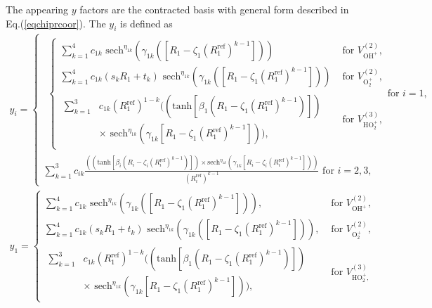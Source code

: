 \documentclass[12pt]{article}
\def\D{\displaystyle}
\begin{document}
The appearing $y$ factors are the contracted basis with general form described in Eq.(\ref{eqchiprcoor}). The $y_i$ is defined as
\begin{equation}
    \begin{split}
        y_i =
        \begin{cases}
            \begin{split}
                \begin{cases}
                    \D\sum_{k=1}^4 c_{1k}\text{ sech}^{\eta_{1k}}(\gamma_{1k}(\left[R_1 - \zeta_1(R_1^{\text{ref}})^{k-1}\right])) &\text{ for } V^{(2)}_{\text{OH}^+},\\
                    \D\sum_{k=1}^4 c_{1k}(s_kR_1 + t_k)\text{ sech}^{\eta_{1k}}(\gamma_{1k}(\left[R_1 - \zeta_1(R_1^{\text{ref}})^{k-1}\right])) &\text{ for } V^{(2)}_{\text{O}_2^+}, \\
                    \begin{split}
                        \D\sum_{k=1}^3 &c_{1k}(R_1^{\text{ref}})^{1-k}((\text{tanh}\left[\beta_1(R_1 - \zeta_1(R_1^\text{ref})^{k-1})\right]) \\ &\times \text{ sech}^{\eta_{1k}}(\gamma_{1k}\left[R_1 - \zeta_1(R_1^{\text{ref}})^{k-1}\right])), 
                    \end{split}
                    &\text{ for } V^{(3)}_{\text{HO}_2^+},
                \end{cases}
                \text{for }i=1,
            \end{split} \\
            \D\sum_{k=1}^3 c_{ik}\frac{((\text{tanh}\left[\beta_i(R_i - \zeta_i(R_i^\text{ref})^{k-1})\right]) \times \text{sech}^{\eta_{1k}}(\gamma_{1k}\left[R_i - \zeta_i(R_i^{\text{ref}})^{k-1}\right]))}{(R_i^{\text{ref}})^{k-1}} \text{ for }i=2,3,
        \end{cases}
    \end{split}
\end{equation}
\iffalse %
\begin{equation}
    \begin{split}
        y_1 = 
        \begin{cases}
            \D\sum_{k=1}^4 c_{1k}\text{ sech}^{\eta_{1k}}(\gamma_{1k}(\left[R_1 - \zeta_1(R_1^{\text{ref}})^{k-1}\right])), &\text{ for } V^{(2)}_{\text{OH}^+},\\
            \D\sum_{k=1}^4 c_{1k}(s_kR_1 + t_k)\text{ sech}^{\eta_{1k}}(\gamma_{1k}(\left[R_1 - \zeta_1(R_1^{\text{ref}})^{k-1}\right])), &\text{ for } V^{(2)}_{\text{O}_2^+}, \\
            \begin{split}
                \D\sum_{k=1}^3 &c_{1k}(R_1^{\text{ref}})^{1-k}((\text{tanh}\left[\beta_1(R_1 - \zeta_1(R_1^\text{ref})^{k-1})\right]) \\ &\times \text{ sech}^{\eta_{1k}}(\gamma_{1k}\left[R_1 - \zeta_1(R_1^{\text{ref}})^{k-1}\right])), 
            \end{split}
            &\text{ for } V^{(3)}_{\text{HO}_2^+,}
        \end{cases}
    \end{split}
    \label{eq:ho2+chipry1}
\end{equation}
\end{document}
